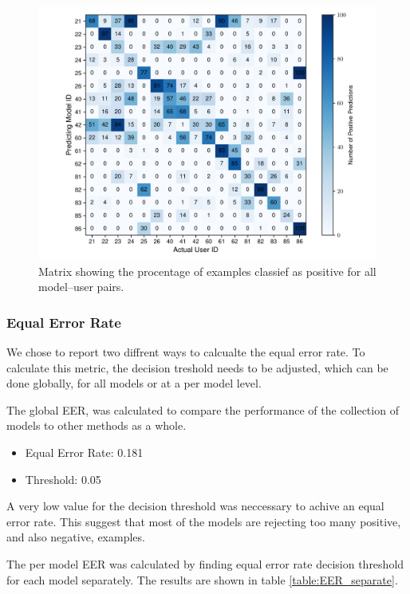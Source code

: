 \begin{figure}[H]
	\centering
	\includegraphics[width=\textwidth]{images/all_models_5_len35.pdf} %
	\caption{Matrix showing the procentage of examples classief as positive for all model--user pairs.}
	\label{fig:all_models_5_len35}
\end{figure}


\subsubsection{Equal Error Rate}
We chose to report two diffrent ways to calcualte the equal error rate. To calculate this metric, the decision treshold needs to be adjusted, which can be done globally, for all models or at a per model level. 

The global EER, was calculated to compare the performance of the collection of models to other methods as a whole.
\begin{itemize}
	\item[] Equal Error Rate: 0.181
	\item[] Threshold: 0.05
\end{itemize}
A very low value for the decision threshold was neccessary to achive an equal error rate. This suggest that most of the models are rejecting too many positive, and also negative, examples.


The per model EER was calculated by finding equal error rate decision threshold for each model separately. The results are shown in table \ref{table:EER_separate}.

